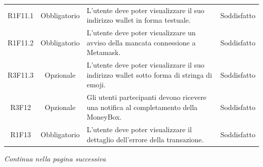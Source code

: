 \begin{table}[H]
\begin{tabular}{c | c | p{6cm} | c}
        R1F11.1                                                           & Obbligatorio & L'utente deve poter visualizzare il suo indirizzo wallet\glo{} in forma testuale.                                & Soddisfatto                    \\
        R1F11.2                                                           & Obbligatorio & L'utente deve poter visualizzare un avviso della mancata connessione a Metamask\glo{}.                     & Soddisfatto                    \\
        R3F11.3                                                           & Opzionale    & L'utente deve poter visualizzare il suo indirizzo wallet\glo{} sotto forma di stringa di emoji.                  & Soddisfatto                    \\
        R3F12                                                             & Opzionale    & Gli utenti partecipanti devono ricevere una notifica al completamento della MoneyBox\glo{}.                & Soddisfatto \\
        R1F13                                                             & Obbligatorio & L'utente deve poter visualizzare il dettaglio dell'errore della transazione.                               & Soddisfatto                  \\
    \end{tabular}
\end{table}
\begin{center}
    \textit{\small Continua nella pagina successiva}
\end{center}
